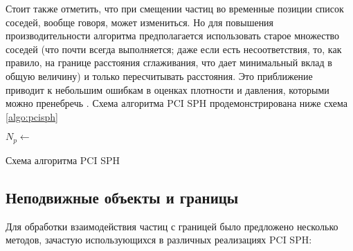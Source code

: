 Стоит также отметить, что при смещении частиц во временные позиции список соседей, вообще говоря, может измениться. Но для повышения производительности алгоритма предполагается использовать старое множество соседей (что почти всегда выполняется; даже если есть несоответствия, то, как правило, на границе расстояния сглаживания, что дает минимальный вклад в общую величину) и только пересчитывать расстояния. Это приближение приводит к небольшим ошибкам в оценках плотности и давления, которыми можно пренебречь \cite{Solenthaler2009}. Схема алгоритма PCI SPH продемонстрирована ниже схема \ref{algo:pcisph}
\begin{algorithm}
\label{algo:pcisph}
\SetAlgoLined
{}

{
${N_{p}} \leftarrow$ \;
}
\caption{Схема алгоритма PCI SPH}
\end{algorithm}

\subsection{Неподвижные объекты и границы}\label{subsec:ch1/sec4/sub2}

Для обработки взаимодействия частиц с границей было предложено несколько методов, зачастую использующихся в различных реализациях PCI SPH:

